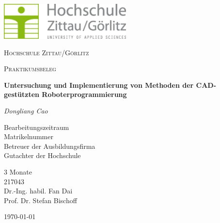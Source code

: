 \documentclass[14pt,a4paper,titlepage]{article}
\begin{document}
	\begin{titlepage}
		\centering
		\includegraphics[width=0.5\textwidth]{HSZG.png}\par\vspace{1cm}
		{\scshape\LARGE Hochschule Zittau/Görlitz \par}
		\vspace{1cm}
		{\scshape\Large Praktikumsbeleg\par}
		\vspace{1.5cm}
		{\huge\bfseries Untersuchung und Implementierung von Methoden der CAD-gestützten Roboterprogrammierung\par}
		\vspace{2cm}
		{\large\itshape Dongliang Cao\par}
		\vspace{2cm}
		\begin{minipage}{2.4in}
			{\large Bearbeitungszeitraum \\ Matrikelnummer \\ Betreuer der Ausbildungsfirma \\ Gutachter der Hochschule}
			
		\end{minipage}
		\hfill
		\begin{minipage}{2.0in}
			{\large 3 Monate \\ 
				217043 \\Dr.-Ing. habil. Fan Dai \\
			Prof. Dr. Stefan Bischoff}
		\end{minipage}
		\vfill
		{\large \today\par}
	\end{titlepage}

	\renewcommand{\abstractname}{Danksagung}
\end{document}
